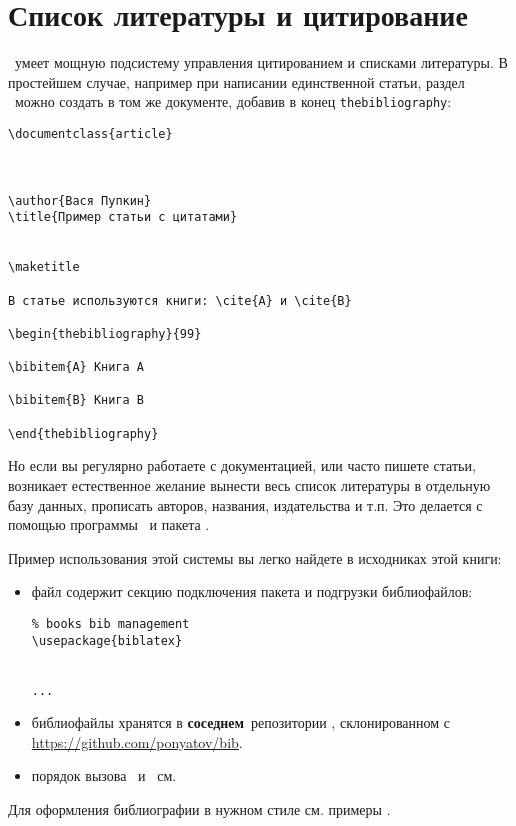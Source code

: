 \section{Список литературы и цитирование}

\latex\ умеет мощную подсистему управления цитированием и списками литературы.
В простейшем случае, например при написании единственной статьи, раздел
\ можно создать в том же документе, добавив в конец
\verb|thebibliography|:

\begin{verbatim}
\documentclass{article}



\author{Вася Пупкин}
\title{Пример статьи с цитатами}


\maketitle
	
В статье используются книги: \cite{A} и \cite{B}
	
\begin{thebibliography}{99}

\bibitem{A} Книга А

\bibitem{B} Книга B
	
\end{thebibliography}

\end{verbatim}

Но если вы регулярно работаете с документацией, или часто пишете статьи,
возникает естественное желание вынести весь список литературы в отдельную базу
данных, прописать авторов, названия, издательства и т.п. Это делается с помощью
программы \ и пакета .

Пример использования этой системы вы легко найдете в исходниках этой книги:

\begin{itemize}
  \item файл  содержит секцию подключения пакета и подгрузки
  библиофайлов:
  \begin{verbatim}% books bib management
\usepackage{biblatex}


...\end{verbatim}
  \item библиофайлы хранятся в \textbf{соседнем}\ репозитории ,
  склонированном с \url{https://github.com/ponyatov/bib}.
  \item порядок вызова \ и \ см. 
\end{itemize}

Для оформления библиографии в нужном стиле см. примеры \cite{bibiso}.
